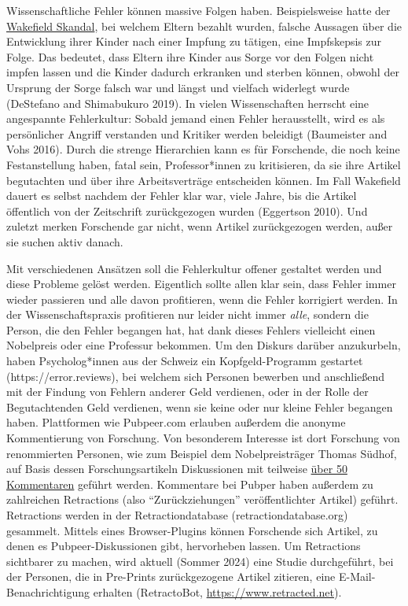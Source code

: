 \documentclass[
  letterpaper,
  DIV=11,
  numbers=noendperiod]{scrreprt}
\begin{document}
Wissenschaftliche Fehler können massive Folgen haben. Beispielsweise
hatte der
\href{https://de.wikipedia.org/wiki/MMR-Impfstoff\#Der_Fall_Wakefield}{Wakefield
Skandal}, bei welchem Eltern bezahlt wurden, falsche Aussagen über die
Entwicklung ihrer Kinder nach einer Impfung zu tätigen, eine Impfskepsis
zur Folge. Das bedeutet, dass Eltern ihre Kinder aus Sorge vor den
Folgen nicht impfen lassen und die Kinder dadurch erkranken und sterben
können, obwohl der Ursprung der Sorge falsch war und längst und vielfach
widerlegt wurde (DeStefano and Shimabukuro 2019). In vielen
Wissenschaften herrscht eine angespannte Fehlerkultur: Sobald jemand
einen Fehler herausstellt, wird es als persönlicher Angriff verstanden
und Kritiker werden beleidigt (Baumeister and Vohs 2016). Durch die
strenge Hierarchien kann es für Forschende, die noch keine
Festanstellung haben, fatal sein, Professor*innen zu kritisieren, da sie
ihre Artikel begutachten und über ihre Arbeitsverträge entscheiden
können. Im Fall Wakefield dauert es selbst nachdem der Fehler klar war,
viele Jahre, bis die Artikel öffentlich von der Zeitschrift
zurückgezogen wurden (Eggertson 2010). Und zuletzt merken Forschende gar
nicht, wenn Artikel zurückgezogen werden, außer sie suchen aktiv danach.

Mit verschiedenen Ansätzen soll die Fehlerkultur offener gestaltet
werden und diese Probleme gelöst werden. Eigentlich sollte allen klar
sein, dass Fehler immer wieder passieren und alle davon profitieren,
wenn die Fehler korrigiert werden. In der Wissenschaftspraxis
profitieren nur leider nicht immer \emph{alle}, sondern die Person, die
den Fehler begangen hat, hat dank dieses Fehlers vielleicht einen
Nobelpreis oder eine Professur bekommen. Um den Diskurs darüber
anzukurbeln, haben Psycholog*innen aus der Schweiz ein Kopfgeld-Programm
gestartet (https://error.reviews), bei welchem sich Personen bewerben
und anschließend mit der Findung von Fehlern anderer Geld verdienen,
oder in der Rolle der Begutachtenden Geld verdienen, wenn sie keine oder
nur kleine Fehler begangen haben. Plattformen wie Pubpeer.com erlauben
außerdem die anonyme Kommentierung von Forschung. Von besonderem
Interesse ist dort Forschung von renommierten Personen, wie zum Beispiel
dem Nobelpreisträger Thomas Südhof, auf Basis dessen Forschungsartikeln
Diskussionen mit teilweise
\href{https://pubpeer.com/publications/F7C42C356B2E7049FDB68A434EF4F8}{über
50 Kommentaren} geführt werden. Kommentare bei Pubper haben außerdem zu
zahlreichen Retractions (also ``Zurückziehungen'' veröffentlichter
Artikel) geführt. Retractions werden in der Retractiondatabase
(retractiondatabase.org) gesammelt. Mittels eines Browser-Plugins können
Forschende sich Artikel, zu denen es Pubpeer-Diskussionen gibt,
hervorheben lassen. Um Retractions sichtbarer zu machen, wird aktuell
(Sommer 2024) eine Studie durchgeführt, bei der Personen, die in
Pre-Prints zurückgezogene Artikel zitieren, eine E-Mail-Benachrichtigung
erhalten (RetractoBot, \url{https://www.retracted.net}).
\end{document}

